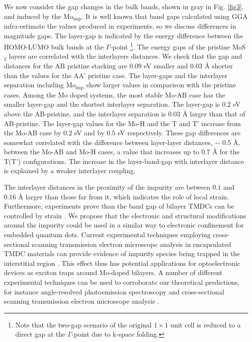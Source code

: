 \documentclass[pra,twocolumn,preprintnumbers,amsmath,amssymb]{revtex4}
\begin{document}
We now consider the gap changes in the bulk bands, shown in gray in Fig. \ref{fig3}, and induced by the Mo$_\mathrm{imp}$.
It is well known that band gaps calculated using GGA
infra-estimate the values produced in experiments, so we discuss differences in magnitude gaps. The layer-gap is indicated by the energy difference between the HOMO-LUMO bulk bands at the $\Gamma$-point
\footnote{Note that the two-gap scenario of the original $1 \times 1$ unit cell is reduced to a direct gap at the $\Gamma$-point due to k-space folding.}.
The energy gaps of the pristine MoS$_2$ layers are correlated with the interlayers distances. We check that the gap and distances for the AB pristine
stacking are $0.09$ eV smaller and $0.03$ \AA{} shorter than the values
for the AA' pristine case.
The layer-gaps and the interlayer separation including Mo$_\mathrm{imp}$ show larger values in comparison with the pristine cases.
Among the Mo doped systems, the most stable Mo-AB case has the smaller layer-gap and the shortest interlayer separation. The layer-gap is $0.2$ eV above the AB-pristine, and the interlayer separation is $0.03$ \AA{} larger than that of AB-pristine.
The layer-gap values for the Mo-H and the T and T’ increase from the Mo-AB case by $0.2 $ eV and by $0.5$ eV respectively.
These gap differences are somewhat correlated with the difference between
layer-layer distances, $\sim$ 0.5 \AA, between the Mo-AB and Mo-H cases,
a value that increases up to $0.7$ \AA{} for the T(T') configurations.
The increase in the layer-band-gap with interlayer distance is explained
by a weaker interlayer coupling.

The interlayer distances in the proximity of the impurity are between
$0.1$ and $0.16$ \AA{} larger than those far from it, which indicates
the role of local strain.
Furthermore, experiments prove than the band gap of bilayer TMDCs can
be controlled by strain %
\cite{castellanos2013local,san2016inverse,feng2012strain}.
We propose that the electronic and structural modifications around the
impurity could be used in a similar way to electronic confinement for embedded
quantum dots. Current experimental techniques employing cross-sectional
scanning transmission electron microscope analysis in
encapsulated TMDC materials can provide evidence of impurity species being
trapped in the interstitial region \cite{rooney2017observing}.  This effect
thus has potential applications for optoelectronic devices as exciton traps
around Mo-doped bilayers.
A number of different experimental techniques can be used to corroborate our theoretical predictions, for instance angle-resolved photoemission spectroscopy and cross-sectional scanning transmission electron microscope analysis \cite{brauer1999modifying,rooney2017observing}.
\end{document}
